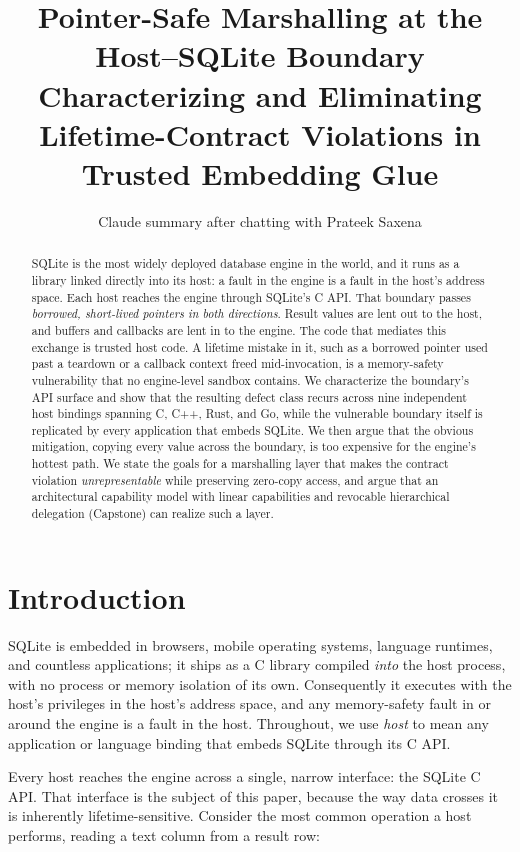 \documentclass[10pt,twocolumn]{article}
\title{\vspace{-2.4em}\textbf{\large Pointer-Safe Marshalling at the Host--SQLite Boundary}\\[0.15em]
\normalsize\textnormal{Characterizing and Eliminating Lifetime-Contract Violations in Trusted Embedding Glue}}
\author{\normalsize Claude summary after chatting with Prateek Saxena}
\date{\vspace{-1.4em}}
\begin{document}
\maketitle
\thispagestyle{empty}

\begin{abstract}
\noindent SQLite is the most widely deployed database engine in the world, and
it runs as a library linked directly into its host: a fault in the engine is a
fault in the host's address space. Each host reaches the engine through
SQLite's C API. That boundary passes \emph{borrowed, short-lived pointers in
both directions}. Result values are lent out to the host, and buffers and
callbacks are lent in to the engine. The code that mediates this exchange is
trusted host code. A lifetime mistake in it, such as a borrowed pointer used
past a teardown or a callback context freed mid-invocation, is a memory-safety
vulnerability that no engine-level sandbox contains. We characterize the
boundary's API surface and show that the resulting defect class recurs across
nine independent host bindings spanning C, C++, Rust, and Go, while the
vulnerable boundary itself is replicated by every application that embeds
SQLite. We then argue that the obvious mitigation, copying every value across
the boundary, is too expensive for the engine's hottest path. We state the
goals for a marshalling layer that makes the contract violation
\emph{unrepresentable} while preserving zero-copy access, and argue that an
architectural capability model with linear capabilities and revocable
hierarchical delegation (Capstone) can realize such a layer.
\end{abstract}

\section{Introduction}

SQLite is embedded in browsers, mobile operating systems, language runtimes,
and countless applications; it ships as a C library compiled \emph{into} the
host process, with no process or memory isolation of its own. Consequently it
executes with the host's privileges in the host's address space, and any
memory-safety fault in or around the engine is a fault in the host. Throughout,
we use \emph{host} to mean any application or language binding that embeds
SQLite through its C API.

Every host reaches the engine across a single, narrow interface: the SQLite C
API. That interface is the subject of this paper, because the way data crosses
it is inherently lifetime-sensitive. Consider the most common operation a host
performs, reading a text column from a result row:
\end{document}
